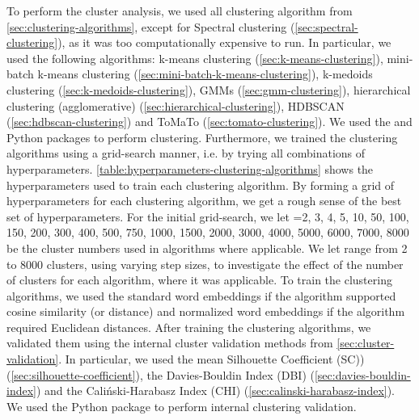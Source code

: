 To perform the cluster analysis, we used all clustering algorithm from \cref{sec:clustering-algorithms}, except for Spectral clustering (\cref{sec:spectral-clustering}), as it was too computationally expensive to run. In particular, we used the following algorithms: k-means clustering (\cref{sec:k-means-clustering}), mini-batch k-means clustering (\cref{sec:mini-batch-k-means-clustering}), k-medoids clustering (\cref{sec:k-medoids-clustering}), GMMs (\cref{sec:gmm-clustering}), hierarchical clustering (agglomerative) (\cref{sec:hierarchical-clustering}), HDBSCAN (\cref{sec:hdbscan-clustering}) and ToMaTo (\cref{sec:tomato-clustering}). We used the  \cite{ScikitLearn2011} and  \cite{mcinnes2017hdbscan} Python packages to perform clustering. Furthermore, we trained the clustering algorithms using a grid-search manner, i.e. by trying all combinations of hyperparameters. \cref{table:hyperparameters-clustering-algorithms} shows the hyperparameters used to train each clustering algorithm. By forming a grid of hyperparameters for each clustering algorithm, we get a rough sense of the best set of hyperparameters. For the initial grid-search, we let =2, 3, 4, 5, 10, 50, 100, 150, 200, 300, 400, 500, 750, 1000, 1500, 2000, 3000, 4000, 5000, 6000, 7000, 8000 be the cluster numbers used in algorithms where applicable. We let  range from 2 to 8000 clusters, using varying step sizes, to investigate the effect of the number of clusters for each algorithm, where it was applicable. To train the clustering algorithms, we used the standard word embeddings if the algorithm supported cosine similarity (or distance) and normalized word embeddings if the algorithm required Euclidean distances. After training the clustering algorithms, we validated them using the internal cluster validation methods from \cref{sec:cluster-validation}. In particular, we used the mean Silhouette Coefficient (SC)) (\cref{sec:silhouette-coefficient}), the Davies-Bouldin Index (DBI) (\cref{sec:davies-bouldin-index}) and the Caliński-Harabasz Index (CHI) (\cref{sec:calinski-harabasz-index}). We used the  Python package to perform internal clustering validation.
